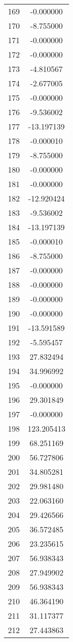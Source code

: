 \documentclass[12pt]{article}
\begin{document}
\begin{longtable}{@{}cc@{}}
169 & -0.000000 \\
170 & -8.755000 \\
171 & -0.000000 \\
172 & -0.000000 \\
173 & -4.810567 \\
174 & -2.677005 \\
175 & -0.000000 \\
176 & -9.536002 \\
177 & -13.197139 \\
178 & -0.000010 \\
179 & -8.755000 \\
180 & -0.000000 \\
181 & -0.000000 \\
182 & -12.920424 \\
183 & -9.536002 \\
184 & -13.197139 \\
185 & -0.000010 \\
186 & -8.755000 \\
187 & -0.000000 \\
188 & -0.000000 \\
189 & -0.000000 \\
190 & -0.000000 \\
191 & -13.591589 \\
192 & -5.595457 \\
193 & 27.832494 \\
194 & 34.996992 \\
195 & -0.000000 \\
196 & 29.301849 \\
197 & -0.000000 \\
198 & 123.205413 \\
199 & 68.251169 \\
200 & 56.727806 \\
201 & 34.805281 \\
202 & 29.981480 \\
203 & 22.063160 \\
204 & 29.426566 \\
205 & 36.572485 \\
206 & 23.235615 \\
207 & 56.938343 \\
208 & 27.949902 \\
209 & 56.938343 \\
210 & 46.364190 \\
211 & 31.117377 \\
212 & 27.443863 \\

\end{longtable}
\end{document}
